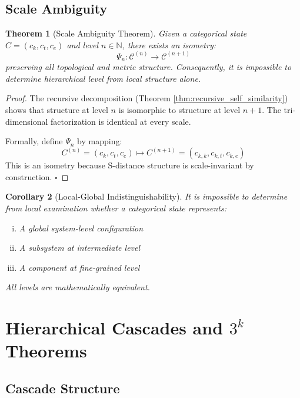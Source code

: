\documentclass[12pt,a4paper]{article}
\newtheorem{theorem}{Theorem}[section]
\newtheorem{corollary}[theorem]{Corollary}
\begin{document}
\subsection{Scale Ambiguity}

\begin{theorem}[Scale Ambiguity Theorem]
\label{thm:scale_ambiguity}
Given a categorical state $C = (c_k, c_t, c_e)$ and level $n \in \mathbb{N}$, there exists an isometry:
\begin{equation}
\Psi_n: \mathcal{C}^{(n)} \to \mathcal{C}^{(n+1)}
\end{equation}
preserving all topological and metric structure. Consequently, it is impossible to determine hierarchical level from local structure alone.
\end{theorem}

\begin{proof}
The recursive decomposition (Theorem \ref{thm:recursive_self_similarity}) shows that structure at level $n$ is isomorphic to structure at level $n+1$. The tri-dimensional factorization is identical at every scale.

Formally, define $\Psi_n$ by mapping:
\begin{equation}
C^{(n)} = (c_k, c_t, c_e) \mapsto C^{(n+1)} = (c_{k,k}, c_{k,t}, c_{k,e})
\end{equation}
This is an isometry because S-distance structure is scale-invariant by construction. $\square$
\end{proof}

\begin{corollary}[Local-Global Indistinguishability]
\label{cor:local_global}
It is impossible to determine from local examination whether a categorical state represents:
\begin{enumerate}[(i)]
\item A global system-level configuration
\item A subsystem at intermediate level
\item A component at fine-grained level
\end{enumerate}
All levels are mathematically equivalent.
\end{corollary}

\section{Hierarchical Cascades and $3^k$ Theorems}

\subsection{Cascade Structure}
\end{document}

